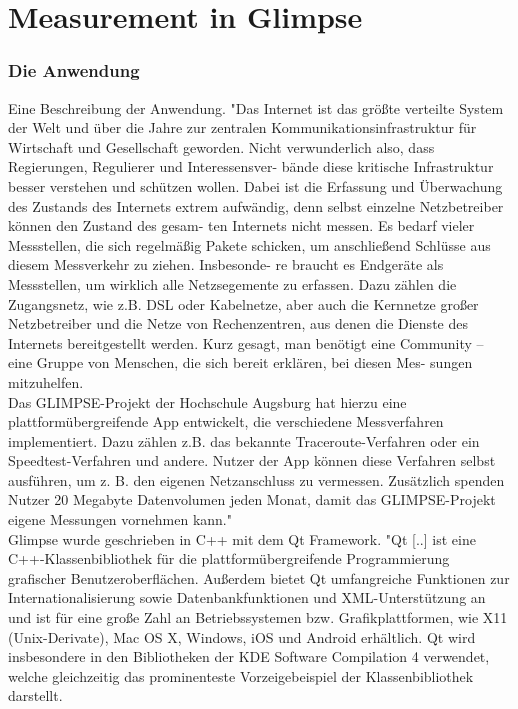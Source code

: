 \documentclass[11pt,a4paper]{article}
\begin{document}
\part{Measurement in Glimpse}
\section{Die Anwendung}
Eine Beschreibung der Anwendung.
"Das Internet ist das größte verteilte System der Welt und über die Jahre zur zentralen Kommunikationsinfrastruktur für Wirtschaft und Gesellschaft geworden. Nicht verwunderlich also, dass Regierungen, Regulierer und Interessensver- bände diese kritische Infrastruktur besser verstehen und schützen wollen. Dabei ist die Erfassung und Überwachung des Zustands des Internets extrem aufwändig, denn selbst einzelne Netzbetreiber können den Zustand des gesam- ten Internets nicht messen. Es bedarf vieler Messstellen, die sich regelmäßig Pakete schicken, um anschließend Schlüsse aus diesem Messverkehr zu ziehen. Insbesonde- re braucht es Endgeräte als Messstellen, um wirklich alle Netzsegemente zu erfassen. Dazu zählen die Zugangsnetz, wie z.B. DSL oder Kabelnetze, aber auch die Kernnetze großer Netzbetreiber und die Netze von Rechenzentren, aus denen die Dienste des Internets bereitgestellt werden. Kurz gesagt, man benötigt eine Community – eine Gruppe von Menschen, die sich bereit erklären, bei diesen Mes- sungen mitzuhelfen.\\
Das GLIMPSE-Projekt der Hochschule Augsburg hat hierzu eine plattformübergreifende App entwickelt,
die verschiedene Messverfahren implementiert. Dazu zählen z.B. das bekannte Traceroute-Verfahren oder
ein Speedtest-Verfahren und andere. Nutzer der App können diese Verfahren selbst ausführen, um z. B. den eigenen Netzanschluss zu vermessen. Zusätzlich spenden Nutzer 20 Megabyte Datenvolumen jeden Monat, damit das GLIMPSE-Projekt eigene Messungen vornehmen kann."
\cite{glimpseDescription}\\
Glimpse wurde geschrieben in C++ mit dem Qt Framework.
"Qt [..] ist eine C++-Klassenbibliothek für die plattformübergreifende Programmierung grafischer Benutzeroberflächen. Außerdem bietet Qt umfangreiche Funktionen zur Internationalisierung sowie Datenbankfunktionen und XML-Unterstützung an und ist für eine große Zahl an Betriebssystemen bzw. Grafikplattformen, wie X11 (Unix-Derivate), Mac OS X, Windows, iOS und Android erhältlich. Qt wird insbesondere in den Bibliotheken der KDE Software Compilation 4 verwendet, welche gleichzeitig das prominenteste Vorzeigebeispiel der Klassenbibliothek darstellt.\\ 
\end{document}
